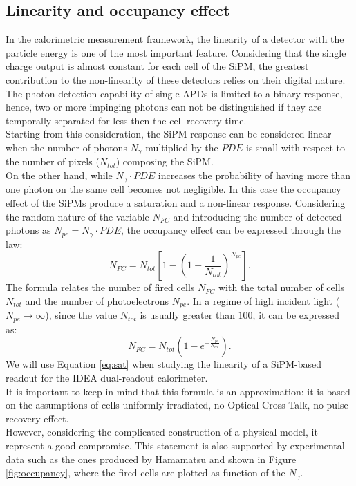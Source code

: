 \subsection{Linearity and occupancy effect}\label{subsec:occupancy_teo}
In the calorimetric measurement framework, the linearity of a detector with the particle energy is one of the most important feature.
Considering that the single charge output is almost constant for each cell of the SiPM, the greatest contribution to the non-linearity of these detectors relies on their digital nature.\\
The photon detection capability of single APDs is limited to a binary response, hence, two or more impinging photons can not be distinguished if they are temporally separated for less then the cell recovery time.\\
Starting from this consideration, the SiPM response can be considered linear when the number of photons $N_{\gamma}$ multiplied by the $PDE$ is small with respect to the number of pixels ($N_{tot}$) composing the SiPM.\\
On the other hand, while $N_{\gamma} \cdot PDE$ increases the probability of having more than one photon on the same cell becomes not negligible. In this case the occupancy effect of the SiPMs produce a saturation and a non-linear response.
Considering the random nature of the variable $N_{FC}$ and introducing the number of detected photons as $N_{pe} = N_{\gamma}\cdot PDE$, the occupancy effect can be expressed through the law:
\begin{equation}
    N_{FC} = N_{tot} \left[1 - \left(1-\frac{1}{N_{tot}}\right)^{N_{pe}}\right].
\end{equation}
The formula relates the number of fired cells $N_{FC}$ with the total number of cells $N_{tot}$ and the number of photoelectrons $N_{pe}$.
In a regime of high incident light ($N_{pe}\rightarrow \infty$), since the value $N_{tot}$ is usually greater than $100$, it can be expressed as:
\begin{equation}\label{eq:sat}
    N_{FC} = N_{tot} \left(1 - e^{-\frac{N_{pe}}{N_{tot}}}\right).
\end{equation}
We will use Equation \ref{eq:sat} when studying the linearity of a SiPM-based readout for the IDEA dual-readout calorimeter.\\
It is important to keep in mind that this formula is an approximation: it is based on the assumptions of cells uniformly irradiated, no Optical Cross-Talk, no pulse recovery effect.\\
However, considering the complicated construction of a physical model, it represent a good compromise. This statement is also supported by experimental data such as the ones produced by Hamamatsu and shown in Figure \ref{fig:occupancy}, where the fired cells are plotted as function of the $N_{\gamma}$.

